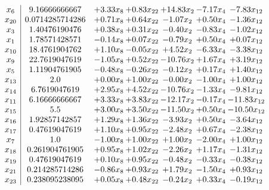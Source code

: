 \documentclass[8pt]{article}
\begin{document}
\[\begin{array}{c| c c@{\hskip 2pt} c@{\hskip 2pt} c@{\hskip 2pt} c@{\hskip 2pt} c@{\hskip 2pt} }
 x_{6}   &  9.16666666667 & +  3.33 x_{8} & +  0.83 x_{22} & + 14.83 x_{2} & -7.17 x_{4} & -7.83 x_{12}\\
 x_{20}   &  0.0714285714286 & +  0.71 x_{8} & +  0.64 x_{22} & -1.07 x_{2} & +  0.50 x_{4} & -1.36 x_{12}\\
 x_{3}   &  1.40476190476 & +  0.38 x_{8} & +  0.31 x_{22} & -0.40 x_{2} & -0.83 x_{4} & -1.02 x_{12}\\
 x_{1}   &  1.78571428571 & -0.14 x_{8} & +  0.07 x_{22} & -0.79 x_{2} & +  0.50 x_{4} & +  0.07 x_{12}\\
 x_{10}   &  18.4761904762 & +  1.10 x_{8} & -0.05 x_{22} & +  4.52 x_{2} & -6.33 x_{4} & -3.38 x_{12}\\
 x_{9}   &  22.7619047619 & -1.05 x_{8} & +  0.52 x_{22} & -10.76 x_{2} & +  1.67 x_{4} & +  3.19 x_{12}\\
 x_{5}   &  1.11904761905 & -0.48 x_{8} & -0.26 x_{22} & -0.12 x_{2} & +  0.17 x_{4} & +  1.40 x_{12}\\
 x_{13}   &  2.0 & +  0.00 x_{8} & +  1.00 x_{22} & -0.00 x_{2} & -1.00 x_{4} & +  1.00 x_{12}\\
 x_{14}   &  6.7619047619 & +  2.95 x_{8} & +  4.52 x_{22} & -10.76 x_{2} & -1.33 x_{4} & -9.81 x_{12}\\
 x_{11}   &  6.16666666667 & +  3.33 x_{8} & +  3.83 x_{22} & -12.17 x_{2} & -0.17 x_{4} & -11.83 x_{12}\\
 x_{15}   &  5.5 & +  3.00 x_{8} & +  3.50 x_{22} & -11.50 x_{2} & +  0.50 x_{4} & -10.50 x_{12}\\
 x_{16}   &  1.92857142857 & +  1.29 x_{8} & +  1.36 x_{22} & -3.93 x_{2} & +  0.50 x_{4} & -3.64 x_{12}\\
 x_{17}   &  0.47619047619 & +  1.10 x_{8} & +  0.95 x_{22} & -2.48 x_{2} & +  0.67 x_{4} & -2.38 x_{12}\\
 x_{7}   &  1.0 & -1.00 x_{8} & +  1.00 x_{22} & +  1.00 x_{2} & -2.00 x_{4} & +  1.00 x_{12}\\
 x_{18}   &  0.261904761905 & +  0.95 x_{8} & +  1.02 x_{22} & -2.26 x_{2} & +  1.17 x_{4} & -1.31 x_{12}\\
 x_{19}   &  0.47619047619 & +  0.10 x_{8} & +  0.95 x_{22} & -0.48 x_{2} & -0.33 x_{4} & -0.38 x_{12}\\
 x_{21}   &  0.214285714286 & -0.86 x_{8} & +  0.93 x_{22} & +  1.79 x_{2} & -1.50 x_{4} & +  0.93 x_{12}\\
 x_{23}   &  0.238095238095 & +  0.05 x_{8} & +  0.48 x_{22} & -0.24 x_{2} & +  0.33 x_{4} & -0.19 x_{12}\\

\end{array}\]
\end{document}

